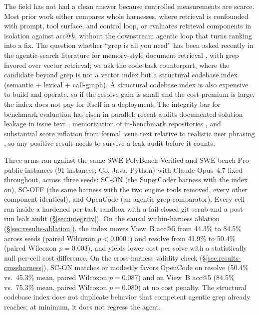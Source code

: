 The field has not had a clean answer because controlled measurements are scarce. Most
prior work either compares whole harnesses, where retrieval is confounded with prompt,
tool surface, and control loop, or evaluates retrieval components in isolation against
acc@$k$, without the downstream agentic loop that turns ranking into a fix. The
question whether ``grep is all you need'' has been asked recently in the agentic-search
literature for memory-style document retrieval \citep{grepallyouneed2026}, with grep
favored over vector retrieval; we ask the code-task counterpart, where the candidate
beyond grep is not a vector index but a structural codebase index (semantic + lexical +
call-graph). A structural codebase index is also expensive to build and operate, so if
the resolve gain is small and the cost premium is large, the index does not pay for
itself in a deployment. The integrity bar for benchmark evaluation has risen in
parallel: recent audits documented solution leakage in issue text
\citep{swebenchplus2024}, memorization of in-benchmark repositories
\citep{swebenchillusion2025}, and substantial score inflation from formal issue text
relative to realistic user phrasing \citep{savingswebench2025}, so any positive result
needs to survive a leak audit before it counts.

Three arms ran against the same SWE-PolyBench Verified and SWE-bench Pro public instances
(91 instances; Go, Java, Python) with Claude Opus~4.7 fixed throughout, across three seeds:
SC-ON (the SuperCoder \citep{supercoder2024} harness with the index on), SC-OFF (the same
harness with the two engine tools removed, every other component identical), and OpenCode
\citep{opencode2025} (an agentic-grep comparator). Every cell ran
inside a hardened per-task sandbox with a fail-closed git scrub and a post-run leak audit
(\S\ref{sec:integrity}). On the causal within-harness ablation
(\S\ref{sec:results-ablation}), the index moves View~B acc@5 from 44.3\% to 84.5\% across
seeds (paired Wilcoxon $p<0.0001$) and resolve from 41.9\% to 50.4\% (paired Wilcoxon
$p=0.003$), and yields lower cost per solve with a statistically null per-cell cost
difference. On the cross-harness validity check
(\S\ref{sec:results-crossharness}), SC-ON matches or modestly favors OpenCode on resolve
(50.4\% vs.\ 45.3\% mean, paired Wilcoxon $p=0.087$) and on View~B acc@5
(84.5\% vs.\ 75.3\% mean, paired Wilcoxon $p=0.080$) at no cost penalty. The
structural codebase index does not duplicate behavior that competent agentic grep already
reaches; at minimum, it does not regress the agent.

